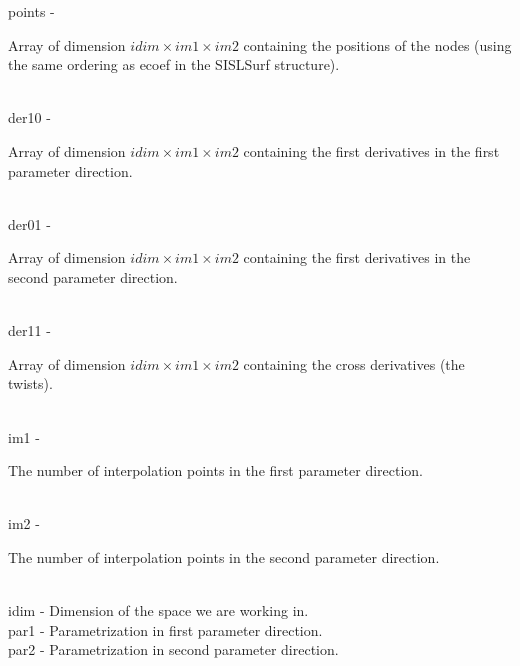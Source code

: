         \>\>    {\fov points} \> - \>
        \begin{minipg2}
          Array of dimension $idim\times im1\times im2$ containing
          the positions of the nodes (using the same ordering
          as {\fov ecoef} in the SISLSurf structure).
        \end{minipg2}\\[0.8ex]
        \>\>    {\fov der10} \> - \>
        \begin{minipg2}
          Array of dimension $idim\times im1\times im2$ containing the
          first derivatives in the first parameter direction.
        \end{minipg2}\\[0.8ex]
        \>\>    {\fov der01} \> - \>
        \begin{minipg2}
          Array of dimension $idim\times im1\times im2$ containing the
          first derivatives in the second parameter direction.
        \end{minipg2}\\[0.8ex]
        \>\>    {\fov der11} \> - \>
        \begin{minipg2}
          Array of dimension $idim\times im1\times im2$ containing the
          cross derivatives (the twists).
        \end{minipg2}\\[0.8ex]
        \>\>    {\fov im1} \> - \>
        \begin{minipg2}
          The number of interpolation points in the
          first parameter direction.
        \end{minipg2}\\[0.8ex]
        \>\>    {\fov im2} \> - \>
        \begin{minipg2}
          The number of interpolation points in the
          second parameter direction.
        \end{minipg2}\\[0.8ex]
        \>\>    {\fov idim} \> - \> Dimension of the space we are working in.\\
        \>\>    {\fov par1} \> - \> Parametrization in first parameter direction.\\
        \>\>    {\fov par2} \> - \> Parametrization in second parameter direction.\\
